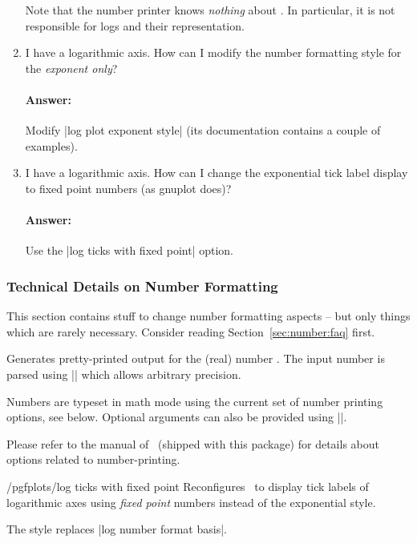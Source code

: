 \begin{enumerate}
	Note that the number printer knows \emph{nothing} about \PGFPlots. In particular, it is not responsible for logs and their representation.

	\item I have a logarithmic axis. How can I modify the number formatting style for the \emph{exponent only}?

	\paragraph{Answer:} Modify |log plot exponent style| (its documentation contains a couple of examples).

	\item I have a logarithmic axis. How can I change the exponential tick label display to fixed point numbers (as gnuplot does)?

	\paragraph{Answer:} Use the |log ticks with fixed point| option.
\end{enumerate}


\subsubsection{Technical Details on Number Formatting}
This section contains stuff to change number formatting aspects -- but only things which are rarely necessary. Consider reading Section~\ref{sec:number:faq} first. 

\begin{command}{\pgfmathprintnumber{}}
Generates pretty-printed output for the (real) number . The input number  is parsed using |\pgfmathfloatparsenumber| which allows arbitrary precision.

Numbers are typeset in math mode using the current set of number printing options, see below. Optional arguments can also be provided using ||.

Please refer to the manual of \PGFPlotstable\ (shipped with this package) for details about options related to number-printing.
\end{command}

\begin{stylekey}{/pgfplots/log ticks with fixed point}
	Reconfigures \PGFPlots\ to display tick labels of logarithmic axes using \emph{fixed point} numbers instead of the exponential style.

\begin{codeexample}[]
\end{codeexample}

	The style replaces |log number format basis|.
\end{stylekey}

